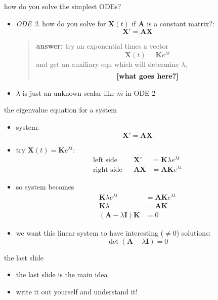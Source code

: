\documentclass[urlcolor=blue,dvipsnames]{beamer}
\newcommand{\bA}{\mathbf{A}}
\newcommand{\bI}{\mathbf{I}}
\newcommand{\bK}{\mathbf{K}}
\newcommand{\bX}{\mathbf{X}}
\begin{document}
\begin{frame}{how do you solve the simplest ODEs?}

\begin{itemize}
\item \emph{ODE 3}.  how do you solve for $\bX(t)$ if $\bA$ is a constant matrix?:
    $$\bX' = \bA \bX$$
    \begin{quote}
    \textbf{answer:}  try an exponential times a vector
        $$\bX(t) = \bK e^{\lambda t}$$
    and get an auxiliary eqn which will determine $\lambda$,
        $$\text{\textbf{[what goes here?]}}$$
    \end{quote}
\item $\lambda$ is just an unknown scalar like $m$ in ODE 2
\end{itemize}
\end{frame}


\begin{frame}{the eigenvalue equation for a system}

\begin{itemize}
\item system:
    $$\bX' = \bA \bX$$
\item try \quad $\bX(t) = \bK e^{\lambda t}$:
    \begin{align*}
         \text{left side}&  & \bX' &= \bK \lambda e^{\lambda t} \\
        \text{right side}&  & \bA\bX &= \bA \bK e^{\lambda t}
    \end{align*}
\item so system becomes
\begin{align*}
    \bK \lambda e^{\lambda t} &= \bA \bK e^{\lambda t} \\
    \bK \lambda &= \bA \bK \\
    \left(\bA - \lambda \bI\right)\bK &= 0
\end{align*}
\item we want this linear system to have interesting ($\ne 0$) solutions:
    $$\det(\bA - \lambda \bI) = 0$$
\end{itemize}
\end{frame}


\begin{frame}{the last slide}

\begin{itemize}
\item \alert{the last slide is the main idea}
\item write it out yourself and understand it!
\end{itemize}
\end{frame}
\end{document}
